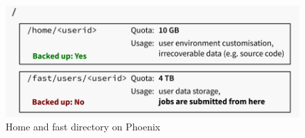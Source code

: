 \begin{figure}[ht]
	\centering
	\includegraphics[width=0.9\linewidth]{images/homeFast.png} 
	\caption{Home and fast directory on Phoenix}
\end{figure}





